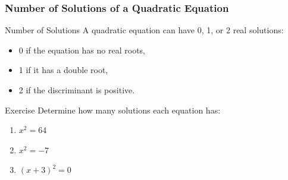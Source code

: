\documentclass[10pt]{beamer}
\begin{document}
	\begin{frame}
		\frametitle{Number of Solutions of a Quadratic Equation}
		
		\begin{block}{Number of Solutions}
			A quadratic equation can have 0, 1, or 2 real solutions:
			\begin{itemize}
				\item 0 if the equation has no real roots,
				\item 1 if it has a double root,
				\item 2 if the discriminant is positive.
			\end{itemize}
		\end{block}
		
		\begin{alertblock}{Exercise}
			Determine how many solutions each equation has:
			\begin{enumerate}
				\item \(x^2 = 64\)
				\item \(x^2 = -7\)
				\item \((x + 3)^2 = 0\)
			\end{enumerate}
		\end{alertblock}
	\end{frame}
	
\end{document}
